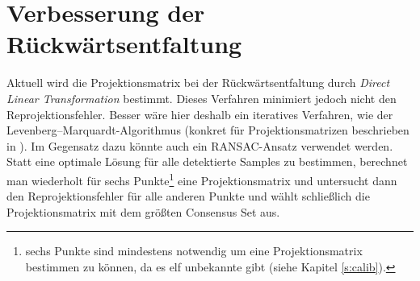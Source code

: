 \section{Verbesserung der Rückwärtsentfaltung}
Aktuell wird die Projektionsmatrix bei der Rückwärtsentfaltung durch \textit{Direct Linear Transformation} bestimmt. Dieses Verfahren minimiert jedoch nicht den Reprojektionsfehler. Besser wäre hier deshalb ein iteratives Verfahren, wie der Levenberg–Marquardt-Algorithmus (konkret für Projektionsmatrizen beschrieben in \cite{Hartley2000}). %
Im Gegensatz dazu könnte auch ein RANSAC-Ansatz verwendet werden. Statt eine optimale Lösung für alle detektierte Samples zu bestimmen, berechnet man wiederholt für sechs Punkte\footnote{sechs Punkte sind mindestens notwendig um eine Projektionsmatrix bestimmen zu können, da es elf unbekannte gibt (siehe Kapitel \ref{s:calib}).} eine Projektionsmatrix und untersucht dann den Reprojektionsfehler für alle anderen Punkte und wählt schließlich die Projektionsmatrix mit dem größten Consensus Set aus. 




